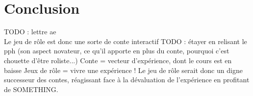 \section*{Conclusion}

TODO : lettre ae\\
Le jeu de rôle est donc une sorte de conte interactif
TODO : étayer en relisant le pph (son aspect novateur, ce qu'il apporte en plus du conte, pourquoi c'est chouette d'être roliste...)
Conte = vecteur d'expérience, dont le cours est en baisse
Jeux de rôle = vivre une expérience !
Le jeu de rôle serait donc un digne successeur des contes, réagissant face à la dévaluation de l'expérience en profitant de SOMETHING.


\clearpage

